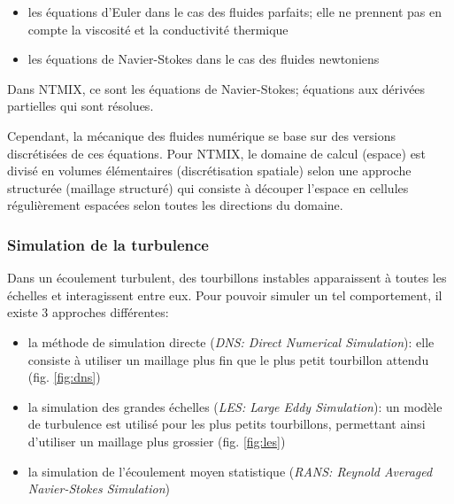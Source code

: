 \begin{itemize}
\item les équations d'Euler dans le cas des fluides parfaits; elle ne prennent pas en compte la viscosité et la conductivité thermique
\item les équations de Navier-Stokes dans le cas des fluides newtoniens
\end{itemize}


Dans NTMIX, ce sont les équations de Navier-Stokes; équations aux dérivées partielles qui sont résolues.

Cependant, la mécanique des fluides numérique se base sur des versions discrétisées de ces équations. Pour NTMIX, le domaine de calcul (espace) est divisé en volumes élémentaires (discrétisation spatiale) selon une approche structurée (maillage structuré) qui consiste à découper l'espace en cellules régulièrement espacées selon toutes les directions du domaine.


\subsubsection{Simulation de la turbulence}
Dans un écoulement turbulent, des tourbillons instables apparaissent à toutes les échelles et interagissent entre eux. Pour pouvoir simuler un tel comportement, il existe 3 approches différentes:

\begin{itemize}
\item la méthode de simulation directe (\textit{DNS: Direct Numerical Simulation}): elle consiste à utiliser un maillage plus fin que le plus petit tourbillon attendu (fig. \ref{fig:dns})
\item la simulation des grandes échelles (\textit{LES: Large Eddy Simulation}): un modèle de turbulence est utilisé pour les plus petits tourbillons, permettant ainsi d'utiliser un maillage plus grossier (fig. \ref{fig:les})
\item la simulation de l'écoulement moyen statistique (\textit{RANS: Reynold Averaged Navier-Stokes Simulation})
\end{itemize} 


